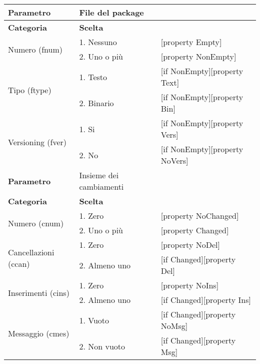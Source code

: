 			\begin{tabular}{|p{4cm}|p{4cm}p{5cm}|}
				\hline
				\cellcolor{Gray} \textbf{Parametro}		& File del package	&											\tabularnewline
				\hline
				\rowcolor{Gray}
				\textbf{Categoria} 						& \textbf{Scelta}			&									\tabularnewline
				\hline
				\multirow{2}{*}{Numero (fnum)} 			& 1. Nessuno				&	[property Empty] 				\tabularnewline
				\cline{2-3}
														& 2. Uno o più				&	[property NonEmpty]				\tabularnewline
				\hline
				\multirow{2}{*}{Tipo (ftype)} 			& 1. Testo					&	[if NonEmpty][property Text] 	\tabularnewline
				\cline{2-3}
														& 2. Binario				&	[if NonEmpty][property Bin]		\tabularnewline
				\hline
				\multirow{2}{*}{Versioning (fver)}		& 1. Si						&	[if NonEmpty][property Vers]	\tabularnewline
				\cline{2-3}
														& 2. No						&	[if NonEmpty][property NoVers]	\tabularnewline
				\hline
				
				
				\cellcolor{Gray} \textbf{Parametro}		& Insieme dei cambiamenti	&									\tabularnewline
				\hline
				\rowcolor{Gray}
				\textbf{Categoria} 						& \textbf{Scelta}			&									\tabularnewline
				\hline
				\multirow{2}{*}{Numero (cnum)} 			& 1. Zero 					&	[property NoChanged]			\tabularnewline
				\cline{2-3}
														& 2. Uno o più				&	[property Changed]				\tabularnewline
				\hline
				\multirow{2}{*}{Cancellazioni (ccan)} 	& 1. Zero	 				&	[property NoDel] 				\tabularnewline
				\cline{2-3}
														& 2. Almeno uno				&	[if Changed][property Del]		\tabularnewline
				\hline
				\multirow{2}{*}{Inserimenti (cins)} 	& 1. Zero 					&	[property NoIns] 				\tabularnewline
				\cline{2-3}
														& 2. Almeno uno 			&	[if Changed][property Ins]		\tabularnewline
				\hline
				\multirow{2}{*}{Messaggio (cmes)} 		& 1. Vuoto 					&	[if Changed][property NoMsg] 	\tabularnewline
				\cline{2-3}
														& 2. Non vuoto 				&	[if Changed][property Msg]		\tabularnewline
				\hline			
				
			\end{tabular}

\vspace{1cm}

